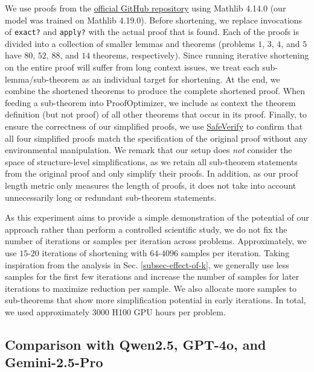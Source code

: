 We use proofs from the \href{https://github.com/ByteDance-Seed/Seed-Prover/tree/17f89e327e4f90f46b0af385efc233dbbe71f8bb/SeedProver/imo2025/IMO2025}{official GitHub repository} using Mathlib 4.14.0 (our model was trained on Mathlib 4.19.0). Before shortening, we replace invocations of \texttt{exact?} and \texttt{apply?} with the actual proof that is found. Each of the proofs is divided into a collection of smaller lemmas and theorems (problems $1$, $3$, $4$, and $5$ have $80$, $52$, $88$, and $14$ theorems, respectively). Since running iterative shortening on the entire proof will suffer from long context issues, we treat each sub-lemma/sub-theorem as an individual target for shortening. At the end, we combine the shortened theorems to produce the complete shortened proof. When feeding a sub-theorem into ProofOptimizer, we include as context the theorem definition (but not proof) of all other theorems that occur in its proof. Finally, to ensure the correctness of our simplified proofs, we use \href{https://github.com/GasStationManager/SafeVerify}{SafeVerify} to confirm that all four simplified proofs match the specification of the original proof without any environmental manipulation. We remark that our setup does \textit{not} consider the space of structure-level simplifications, as we retain all sub-theorem statements from the original proof and only simplify their proofs. In addition, as our proof length metric only measures the length of proofs, it does not take into account unnecessarily long or redundant sub-theorem statements. 

As this experiment aims to provide a simple demonstration of the potential of our approach rather than perform a controlled scientific study, we do not fix the number of iterations or samples per iteration across problems. Approximately, we use $15$-$20$ iterations of shortening with $64$-$4096$ samples per iteration. Taking inspiration from the analysis in Sec. \ref{subsec-effect-of-k}, we generally use less samples for the first few iterations and increase the number of samples for later iterations to maximize reduction per sample. We also allocate more samples to sub-theorems that show more simplification potential in early iterations. In total, we used approximately $3000$ H100 GPU hours per problem.

\newpage
\subsection{Comparison with Qwen2.5, GPT-4o, and Gemini-2.5-Pro} \label{subsec:leading-model-comparison}

